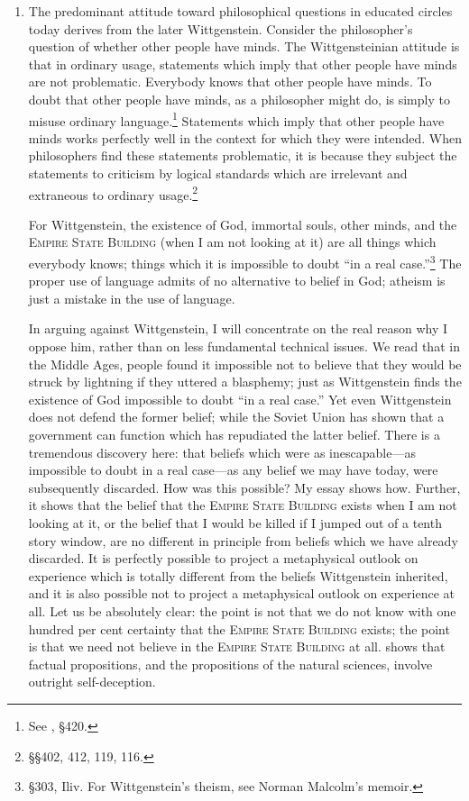
\begin{enumerate}[label=\textbf{\Alph*.}, wide, nosep, itemsep=1em]
\item The predominant attitude toward philosophical questions in educated circles today derives from the later Wittgenstein. Consider the philosopher's question of whether other people have minds. The Wittgensteinian attitude is that in ordinary usage, statements which imply that other people have minds are not problematic. Everybody knows that other people have minds. To doubt that other people have minds, as a philosopher might do, is simply to misuse ordinary language.\footnote{See , \S 420.} Statements which imply that other people have minds works perfectly well in the context for which they were intended. When philosophers find these statements problematic, it is because they subject the statements to criticism by logical standards which are irrelevant and extraneous to ordinary usage.\footnote{\S \S 402, 412, 119, 116.}

For Wittgenstein, the existence of God, immortal souls, other minds, and the \textsc{Empire State Building} (when I am not looking at it) are all things which everybody knows; things which it is impossible to doubt \enquote{in a real case.}\footnote{\S 303, Iliv. For Wittgenstein's theism, see Norman Malcolm's memoir.} The proper use of language admits of no alternative to belief in God; atheism is just a mistake in the use of language. 

In arguing against Wittgenstein, I will concentrate on the real reason why I oppose him, rather than on less fundamental technical issues. We read that in the Middle Ages, people found it impossible not to believe that they would be struck by lightning if they uttered a blasphemy; just as Wittgenstein finds the existence of God impossible to doubt \enquote{in a real case.} Yet even Wittgenstein does not defend the former belief; while the Soviet Union has shown that a government can function which has repudiated the latter belief. There is a tremendous discovery here: that beliefs which were as inescapable---as impossible to doubt in a real case---as any belief we may have today, were subsequently discarded. How was this possible? My essay  shows how. Further, it shows that the belief that the \textsc{Empire State Building} exists when I am not looking at it, or the belief that I would be killed if I jumped out of a tenth story window, are no different in principle from beliefs which we have already discarded. It is perfectly possible to project a metaphysical outlook on experience which is totally different from the beliefs Wittgenstein inherited, and it is also possible not to project a metaphysical outlook on experience at all. Let us be absolutely clear: the point is not that we do not know with one hundred per cent certainty that the \textsc{Empire State Building} exists; the point is that we need not believe in the \textsc{Empire State Building} at all.  shows that factual propositions, and the propositions of the natural sciences, involve outright self-deception. 


\end{enumerate}
